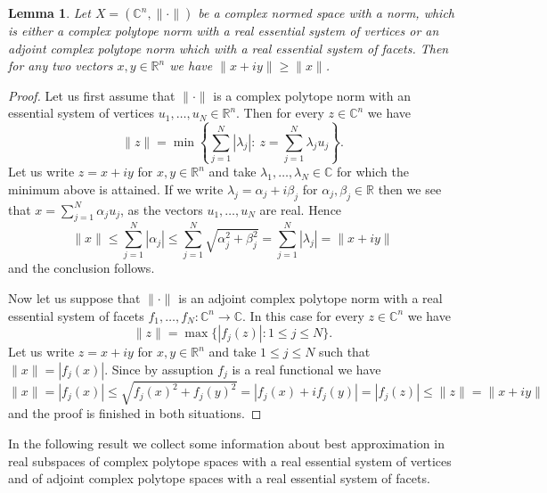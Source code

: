 \documentclass[12pt, reqno]{amsart}
\newtheorem{lem}[twr]{Lemma}
\theoremstyle{definition}
\theoremstyle{remark}
\numberwithin{equation}{section}
\begin{document}
\begin{lem}
\label{lemreal}
Let $X=(\mathbb{C}^n, \| \cdot \|)$ be a complex normed space with a norm, which is either a complex polytope norm with a real essential system of vertices or an adjoint complex polytope norm which with a real essential system of facets. Then for any two vectors $x, y \in \mathbb{R}^n$ we have $\|x+iy\| \geq \|x\|$. 
\end{lem}
\begin{proof}
Let us first assume that $\| \cdot \|$ is a complex polytope norm with an essential system of vertices $u_1, \ldots, u_N \in \mathbb{R}^n$. Then for every $z \in \mathbb{C}^n$ we have
$$\|z\| = \min \left \{ \sum_{j=1}^{N} |\lambda_j|: \ z = \sum_{j=1}^{N} \lambda_j u_j \right \}. $$
Let us write $z = x+iy$ for $x, y \in \mathbb{R}^n$ and take $\lambda_1, \ldots, \lambda_N \in \mathbb{C}$ for which the minimum above is attained. If we write $\lambda_j = \alpha_j + i\beta_j$ for $\alpha_j, \beta_j \in \mathbb{R}$ then we see that $x = \sum_{j=1}^{N} \alpha_j u_j$, as the vectors $u_1, \ldots, u_N$ are real. Hence
$$\|x\| \leq \sum_{j=1}^{N} |\alpha_j| \leq \sum_{j=1}^{N} \sqrt{\alpha^2_j+\beta^2_j} = \sum_{j=1}^{N} |\lambda_j|=\|x+iy\|$$
and the conclusion follows.

Now let us suppose that $\| \cdot \|$ is an adjoint complex polytope norm with a real essential system of facets $f_1, \ldots, f_N: \mathbb{C}^n \to \mathbb{C}$. In this case for every $z \in \mathbb{C}^n$ we have
$$\|z\| = \max \{|f_j(z)|: 1 \leq j \leq N\}.$$
Let us write $z = x+iy$ for $x, y \in \mathbb{R}^n$ and take $1 \leq j \leq N$ such that $\|x\|=|f_j(x)|$. Since by assuption $f_j$ is a real functional we have
$$\|x\| = |f_j(x)| \leq \sqrt{f_j(x)^2 + f_j(y)^2} = |f_j(x) + if_j(y)| = |f_j(z)|  \leq \|z\| = \|x+iy\|$$
and the proof is finished in both situations.
\end{proof}

In the following result we collect some information about best approximation in real subspaces of complex polytope spaces with a real essential system of vertices and of adjoint complex polytope spaces with a real essential system of facets.
\end{document}
